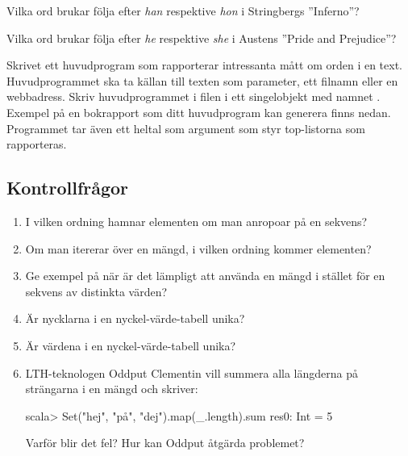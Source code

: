 \Subtask Vilka ord brukar följa efter \emph{han} respektive \emph{hon} i Stringbergs ''Inferno''?

\Subtask Vilka ord brukar följa efter \emph{he} respektive \emph{she} i Austens ''Pride and Prejudice''?


\Task Skrivet ett huvudprogram som rapporterar intressanta mått om orden i en text. Huvudprogrammet ska ta källan till texten som parameter, ett filnamn eller en webbadress. Skriv huvudprogrammet i filen  i ett singelobjekt med namnet . Exempel på en bokrapport som ditt huvudprogram kan generera finns nedan. Programmet tar även ett heltal som argument som styr top-listorna som rapporteras.




\subsection{Kontrollfrågor}

\begin{enumerate}
\item I vilken ordning hamnar elementen om man anropoar  på en sekvens?

\item Om man itererar över en mängd, i vilken ordning kommer elementen? 

\item Ge exempel på när är det lämpligt att använda en mängd i stället för en sekvens av distinkta värden?

\item Är nycklarna i en nyckel-värde-tabell unika?

\item Är värdena i en nyckel-värde-tabell unika?

\item LTH-teknologen Oddput Clementin vill summera alla längderna på strängarna i en mängd och skriver:
\begin{REPL}
scala> Set("hej", "på", "dej").map(_.length).sum
res0: Int = 5
\end{REPL}
Varför blir det fel? Hur kan Oddput åtgärda problemet?
\end{enumerate}

